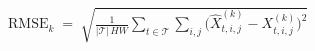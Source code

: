 \documentclass[border=10pt,varwidth=\maxdimen]{standalone}
\begin{document}
\(\displaystyle \mathrm{RMSE}_k \;=\; \sqrt{\frac{1}{|\mathcal{T}|\,HW}\sum_{t \in \mathcal{T}}\sum_{i,j}\big(\hat{X}^{(k)}_{t,i,j} - X^{(k)}_{t,i,j}\big)^2} \)
\end{document}
